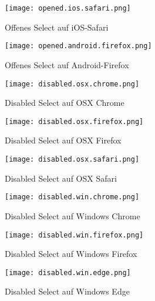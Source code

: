 \begin{figure}[!htb]
    \centering
    \begin{minipage}[b]{0.45\textwidth}
        \centering
        \texttt{[image: opened.ios.safari.png]}
        \caption{\centering Offenes Select auf iOS-Safari}
        \label{img:openedIosSafariSelect}
    \end{minipage}
    \hfill
    \begin{minipage}[b]{0.45\textwidth}
        \centering
        \texttt{[image: opened.android.firefox.png]}
        \caption{\centering Offenes Select auf Android-Firefox}
        \label{img:openedAndroidFirefoxSelect}
    \end{minipage}
\end{figure}


\begin{figure}[!htb]
    \centering
    \begin{minipage}[b]{0.28\textwidth}
        \centering
        \texttt{[image: disabled.osx.chrome.png]}
        \caption{\centering Disabled Select auf OSX Chrome}
        \label{img:disabledOsxChromeSelect}
    \end{minipage}
    \hfill
    \begin{minipage}[b]{0.28\textwidth}
        \centering
        \texttt{[image: disabled.osx.firefox.png]}
        \caption{\centering Disabled Select auf OSX Firefox}
        \label{img:disabledOsxFirefoxSelect}
    \end{minipage}
    \hfill
    \begin{minipage}[b]{0.28\textwidth}
        \centering
        \texttt{[image: disabled.osx.safari.png]}
        \caption{\centering Disabled Select auf OSX Safari}
        \label{img:disabledOsxSafariSelect}
    \end{minipage}
\end{figure}

\begin{figure}[!htb]
    \centering
    \begin{minipage}[b]{0.28\textwidth}
        \centering
        \texttt{[image: disabled.win.chrome.png]}
        \caption{\centering Disabled Select auf Windows Chrome}
        \label{img:disabledWinChromeSelect}
    \end{minipage}
    \hfill
    \begin{minipage}[b]{0.28\textwidth}
        \centering
        \texttt{[image: disabled.win.firefox.png]}
        \caption{\centering Disabled Select auf Windows Firefox}
        \label{img:disabledWinFirefoxSelect}
    \end{minipage}
    \hfill
    \begin{minipage}[b]{0.28\textwidth}
        \centering
        \texttt{[image: disabled.win.edge.png]}
        \caption{\centering Disabled Select auf Windows Edge}
        \label{img:disabledWinEdgeSelect}
    \end{minipage}
\end{figure}

